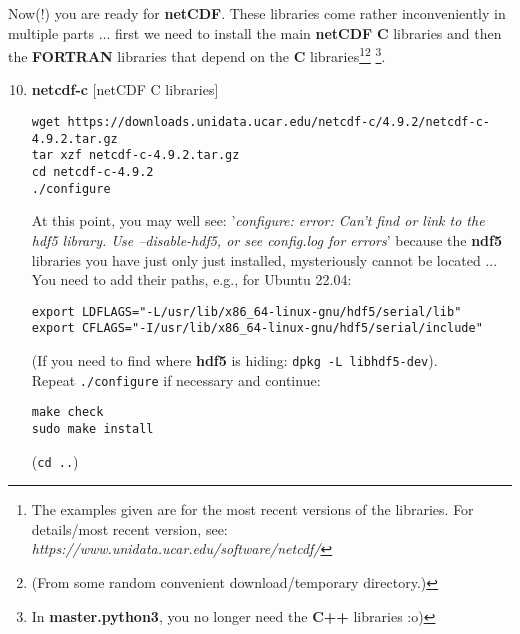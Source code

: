 \documentclass[10pt,twoside]{article}
\begin{document}
\noindent Now(!) you are ready for \textbf{netCDF}. These libraries come rather inconveniently in multiple parts ... first we need to install the main \textbf{netCDF} \textbf{C} libraries and then the \textbf{FORTRAN} libraries that depend on the \textbf{C} libraries\footnote{The examples given are for the most recent versions of the libraries. For details/most recent version, see: \textit{https://www.unidata.ucar.edu/software/netcdf/}}\footnote{(From some random convenient download/temporary directory.)} \footnote{In \textbf{master.python3}, you no longer need the \textbf{C++} libraries :o)}. 

\vspace{2pt}

\begin{enumerate}[noitemsep]
\setcounter{enumi}{9}

\vspace{4pt}
\item \textbf{netcdf-c} [netCDF C libraries]

\vspace{-2pt}
\begin{verbatim}
wget https://downloads.unidata.ucar.edu/netcdf-c/4.9.2/netcdf-c-4.9.2.tar.gz
tar xzf netcdf-c-4.9.2.tar.gz
cd netcdf-c-4.9.2
./configure
\end{verbatim}
At this point, you may well see: '\textit{configure: error: Can't find or link to the hdf5 library. Use --disable-hdf5, or see config.log for errors}' because the \textbf{ndf5} libraries you have just only just installed, mysteriously cannot be located ... You need to add their paths, e.g., for Ubuntu 22.04:
\vspace{-2pt}
\begin{verbatim}
export LDFLAGS="-L/usr/lib/x86_64-linux-gnu/hdf5/serial/lib"
export CFLAGS="-I/usr/lib/x86_64-linux-gnu/hdf5/serial/include"
\end{verbatim}
(If you need to find where \textbf{hdf5} is hiding: \texttt{dpkg -L libhdf5-dev}).
\vspace{2pt}
\\Repeat \texttt{./configure} if necessary and continue:
\vspace{-2pt}
\begin{verbatim}
make check
sudo make install
\end{verbatim}
\vspace{-2pt}
(\texttt{cd ..})

\end{enumerate}
\end{document}
